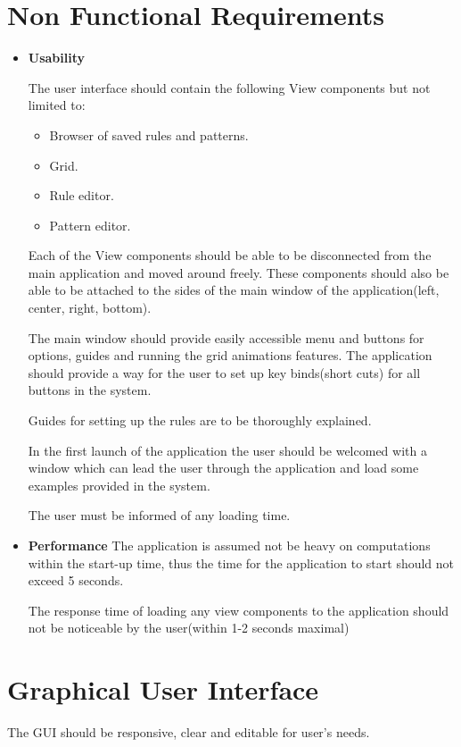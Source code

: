 \documentclass{article}
\begin{document}
\section{Non Functional Requirements}
\begin{itemize}
	\item \Large { \bf Usability} 

	The user interface should contain the following View components but not limited to:
	\begin{itemize}
		\item Browser of saved rules and patterns.
		\item Grid.
		\item Rule editor.
		\item Pattern editor.
	\end{itemize}
	Each of the View components should be able to be disconnected from the main application
	and moved around freely. These components should also be able to be attached to the sides
	of the main window of the application(left, center, right, bottom).
	
	The main window should provide easily accessible menu and buttons for options, guides
	and running the grid animations features. The application should provide a way for the user
	to set up key binds(short cuts) for all buttons in the system.
	
	Guides for setting up the rules are to be thoroughly explained.
	
	In the first launch of the application the user should be welcomed with a window
	which can lead the user through the application and load some examples provided in the 
	system.
	
	The user must be informed of any loading time.

	
	\item \Large {\bf Performance }
	The application is assumed not be heavy on computations within the start-up time,
	thus the time for the application to start should not exceed 5 seconds.

	The response time of loading any view components to the application should not be noticeable by the user(within 1-2 seconds maximal)
	
	
\end{itemize} 

\section{Graphical User Interface}
	The GUI should be responsive, clear and editable for user's needs.
	
\end{document}
